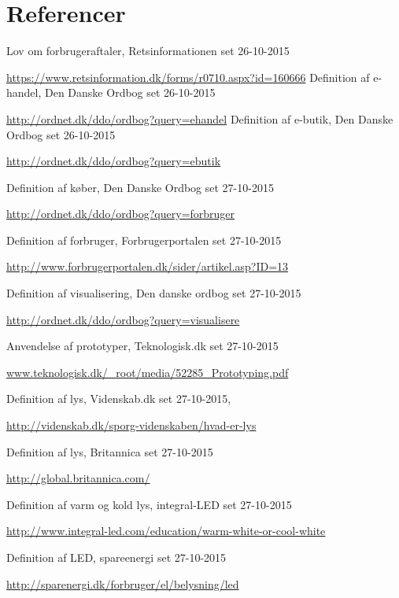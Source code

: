\section{Referencer}

\begin{thebibliography}{99}
  Lov om forbrugeraftaler,
  Retsinformationen
  set 26-10-2015
  
  \url{https://www.retsinformation.dk/forms/r0710.aspx?id=160666}
  Definition af e-handel,
  Den Danske Ordbog
  set 26-10-2015
  
  \url{http://ordnet.dk/ddo/ordbog?query=ehandel}
  Definition af e-butik,
  Den Danske Ordbog
  set 26-10-2015
  
  \url{http://ordnet.dk/ddo/ordbog?query=ebutik}

  Definition af køber,
  Den Danske Ordbog
  set 27-10-2015
  
  \url{http://ordnet.dk/ddo/ordbog?query=forbruger}

  Definition af forbruger,
  Forbrugerportalen
  set 27-10-2015
  
  \url{http://www.forbrugerportalen.dk/sider/artikel.asp?ID=13}

  Definition af visualisering,
  Den danske ordbog
  set 27-10-2015
  
  \url{http://ordnet.dk/ddo/ordbog?query=visualisere}

  Anvendelse af prototyper,
  Teknologisk.dk
  set 27-10-2015
  
  \url{www.teknologisk.dk/_root/media/52285_Prototyping.pdf}

  Definition af lys,
  Videnskab.dk
  set 27-10-2015,
  
  \url{http://videnskab.dk/sporg-videnskaben/hvad-er-lys}

  Definition af lys,
  Britannica
  set 27-10-2015
  
  \url{http://global.britannica.com/}

  Definition af varm og kold lys,
  integral-LED
  set 27-10-2015
  
  \url{http://www.integral-led.com/education/warm-white-or-cool-white}

  Definition af LED,
  spareenergi
  set 27-10-2015
  
  \url{http://sparenergi.dk/forbruger/el/belysning/led}


\end{thebibliography}
